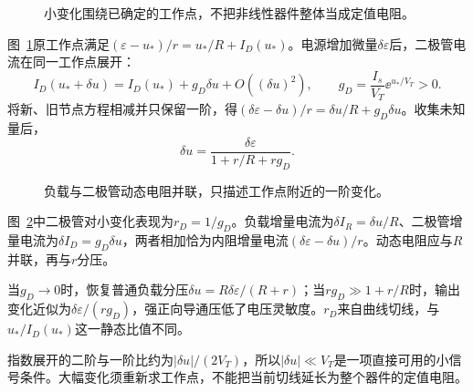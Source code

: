 \begin{figure}[H]\centering
{}
\caption{小变化围绕已确定的工作点，不把非线性器件整体当成定值电阻。}\label{fig:c4-h5-q}
\end{figure}
\begin{solution}
图~\ref{fig:c4-h5-q}原工作点满足$(\varepsilon-u_*)/r=u_*/R+I_D(u_*)$。电源增加微量$\delta\varepsilon$后，二极管电流在同一工作点展开：
\[
 I_D(u_*+\delta u)=I_D(u_*)+g_D\delta u+O((\delta u)^2),
 \qquad g_D=\frac{I_s}{V_T}\ee^{u_*/V_T}>0.
\]
将新、旧节点方程相减并只保留一阶，得$(\delta\varepsilon-\delta u)/r=\delta u/R+g_D\delta u$。收集未知量后，
\[
 \boxed{\delta u=\frac{\delta\varepsilon}{1+r/R+rg_D}}.
\]
\begin{figure}[H]\centering
{}
\caption{负载与二极管动态电阻并联，只描述工作点附近的一阶变化。}\label{fig:c4-h5-s}
\end{figure}
图~\ref{fig:c4-h5-s}中二极管对小变化表现为$r_D=1/g_D$。负载增量电流为$\delta I_R=\delta u/R$、二极管增量电流为$\delta I_D=g_D\delta u$，两者相加恰为内阻增量电流$(\delta\varepsilon-\delta u)/r$。动态电阻应与$R$并联，再与$r$分压。

当$g_D\to0$时，恢复普通负载分压$\delta u=R\delta\varepsilon/(R+r)$；当$rg_D\gg1+r/R$时，输出变化近似为$\delta\varepsilon/(rg_D)$，强正向导通压低了电压灵敏度。$r_D$来自曲线切线，与$u_*/I_D(u_*)$这一静态比值不同。

指数展开的二阶与一阶比约为$|\delta u|/(2V_T)$，所以$|\delta u|\ll V_T$是一项直接可用的小信号条件。大幅变化须重新求工作点，不能把当前切线延长为整个器件的定值电阻。
\end{solution}
\endgroup

